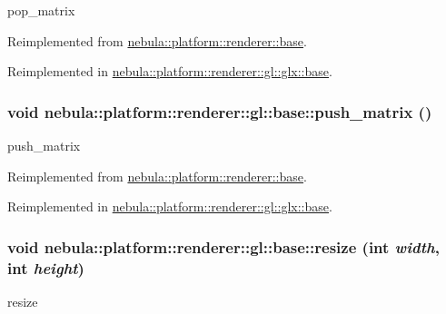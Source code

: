 pop\_\-matrix 

Reimplemented from \hyperlink{classnebula_1_1platform_1_1renderer_1_1base_a973b0e5edc9ed9b90a4ab2f209794e24}{nebula::platform::renderer::base}.

Reimplemented in \hyperlink{classnebula_1_1platform_1_1renderer_1_1gl_1_1glx_1_1base_aa01b481132d930627aecfa43080c1527}{nebula::platform::renderer::gl::glx::base}.\hypertarget{classnebula_1_1platform_1_1renderer_1_1gl_1_1base_add015b34e9567bfaca68a94c0cb76b06}{
\subsubsection[{push\_\-matrix}]{\setlength{\rightskip}{0pt plus 5cm}void nebula::platform::renderer::gl::base::push\_\-matrix ()}}
\label{classnebula_1_1platform_1_1renderer_1_1gl_1_1base_add015b34e9567bfaca68a94c0cb76b06}


push\_\-matrix 

Reimplemented from \hyperlink{classnebula_1_1platform_1_1renderer_1_1base_a6e3c0756670cb17a277b7e0ab0bab5a1}{nebula::platform::renderer::base}.

Reimplemented in \hyperlink{classnebula_1_1platform_1_1renderer_1_1gl_1_1glx_1_1base_a2bf526a5a2f23318008cd1fa40a68d52}{nebula::platform::renderer::gl::glx::base}.\hypertarget{classnebula_1_1platform_1_1renderer_1_1gl_1_1base_a03a1e79ed69dc5d9e2a0835986dbe29c}{
\subsubsection[{resize}]{\setlength{\rightskip}{0pt plus 5cm}void nebula::platform::renderer::gl::base::resize (int {\em width}, \/  int {\em height})}}
\label{classnebula_1_1platform_1_1renderer_1_1gl_1_1base_a03a1e79ed69dc5d9e2a0835986dbe29c}


resize 

